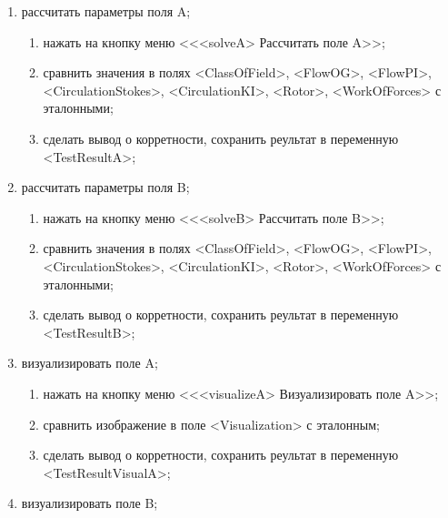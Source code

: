 \documentclass[14pt,a4paper,final]{extreport}
\begin{document}
\begin{enumerate}[label=\arabic*.]
\item рассчитать параметры поля A;
    \begin{enumerate}[label*=\arabic*.,
                      leftmargin=1.5cm, %
                      labelsep=0.5cm] %

    \item нажать на кнопку меню <<<solveA> Рассчитать поле A>>;
    \item сравнить значения в полях <ClassOfField>, <FlowOG>, <FlowPI>, <CirculationStokes>, <CirculationKI>, <Rotor>, <WorkOfForces> с эталонными;
    \item сделать вывод о корретности, сохранить реультат в переменную <TestResultA>;
    \end{enumerate}

\item рассчитать параметры поля B;
    \begin{enumerate}[label*=\arabic*.,
                      leftmargin=1.5cm, %
                      labelsep=0.5cm] %

    \item нажать на кнопку меню <<<solveB> Рассчитать поле B>>;
    \item сравнить значения в полях <ClassOfField>, <FlowOG>, <FlowPI>, <CirculationStokes>, <CirculationKI>, <Rotor>, <WorkOfForces> с эталонными;
    \item сделать вывод о корретности, сохранить реультат в переменную <TestResultB>;
    \end{enumerate}

\item визуализировать поле A;
    \begin{enumerate}[label*=\arabic*.,
                      leftmargin=1.5cm, %
                      labelsep=0.5cm] %

    \item нажать на кнопку меню <<<visualizeA> Визуализировать поле A>>;
    \item сравнить изображение в поле <Visualization> с эталонным;
    \item сделать вывод о корретности, сохранить реультат в переменную <TestResultVisualA>;
    \end{enumerate}

\item визуализировать поле B;
    \begin{enumerate}[label*=\arabic*.,
                      leftmargin=1.5cm, %
                      labelsep=0.5cm] %


\end{enumerate}
\end{enumerate}
\end{document}
